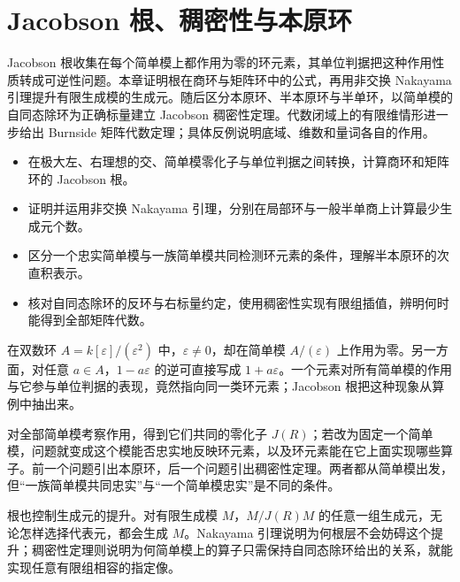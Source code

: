 
\chapter{Jacobson 根、稠密性与本原环}
\label{b2:ch:14}

\begin{chapterabstract}
	Jacobson 根收集在每个简单模上都作用为零的环元素，其单位判据把这种作用性质转成可逆性问题。本章证明根在商环与矩阵环中的公式，再用非交换 Nakayama 引理提升有限生成模的生成元。随后区分本原环、半本原环与半单环，以简单模的自同态除环为正确标量建立 Jacobson 稠密性定理。代数闭域上的有限维情形进一步给出 Burnside 矩阵代数定理；具体反例说明底域、维数和量词各自的作用。
\end{chapterabstract}

\begin{learninggoals}
	\begin{itemize}
		\item 在极大左、右理想的交、简单模零化子与单位判据之间转换，计算商环和矩阵环的 Jacobson 根。
		\item 证明并运用非交换 Nakayama 引理，分别在局部环与一般半单商上计算最少生成元个数。
		\item 区分一个忠实简单模与一族简单模共同检测环元素的条件，理解半本原环的次直积表示。
		\item 核对自同态除环的反环与右标量约定，使用稠密性实现有限组插值，辨明何时能得到全部矩阵代数。
	\end{itemize}
\end{learninggoals}

在双数环 \(A=k[\varepsilon]/(\varepsilon^2)\) 中，\(\varepsilon\ne0\)，却在简单模 \(A/(\varepsilon)\) 上作用为零。另一方面，对任意 \(a\in A\)，\(1-a\varepsilon\) 的逆可直接写成 \(1+a\varepsilon\)。一个元素对所有简单模的作用与它参与单位判据的表现，竟然指向同一类环元素；Jacobson 根把这种现象从算例中抽出来。

\ProseParagraphBreak

对全部简单模考察作用，得到它们共同的零化子 \(J(R)\)；若改为固定一个简单模，问题就变成这个模能否忠实地反映环元素，以及环元素能在它上面实现哪些算子。前一个问题引出本原环，后一个问题引出稠密性定理。两者都从简单模出发，但“一族简单模共同忠实”与“一个简单模忠实”是不同的条件。

\ProseParagraphBreak

根也控制生成元的提升。对有限生成模 \(M\)，\(M/J(R)M\) 的任意一组生成元，无论怎样选择代表元，都会生成 \(M\)。Nakayama 引理说明为何根层不会妨碍这个提升；稠密性定理则说明为何简单模上的算子只需保持自同态除环给出的关系，就能实现任意有限组相容的指定像。

